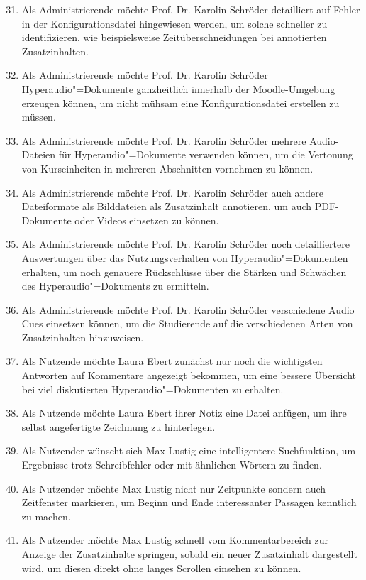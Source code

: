 \begin{enumerate}[leftmargin=1.3cm,label=US-\arabic*:,ref=US-\arabic*]
\setcounter{enumi}{30}
\item Als Administrierende möchte Prof. Dr. Karolin Schröder detailliert auf Fehler in der Konfigurationsdatei hingewiesen werden, um solche schneller zu identifizieren, wie beispielsweise Zeitüberschneidungen bei annotierten Zusatzinhalten.
\item Als Administrierende möchte Prof. Dr. Karolin Schröder Hyperaudio"=Dokumente ganzheitlich innerhalb der Moodle-Umgebung erzeugen können, um nicht mühsam eine Konfigurationsdatei erstellen zu müssen.
\item Als Administrierende möchte Prof. Dr. Karolin Schröder mehrere Audio-Dateien für Hyperaudio"=Dokumente verwenden können, um die Vertonung von Kurseinheiten in mehreren Abschnitten vornehmen zu können.
\item Als Administrierende möchte Prof. Dr. Karolin Schröder auch andere Dateiformate als Bilddateien als Zusatzinhalt annotieren, um auch PDF-Dokumente oder Videos einsetzen zu können.
\item Als Administrierende möchte Prof. Dr. Karolin Schröder noch detailliertere Auswertungen über das Nutzungsverhalten von Hyperaudio"=Dokumenten erhalten, um noch genauere Rückschlüsse über die Stärken und Schwächen des Hyperaudio"=Dokuments zu ermitteln. 
\item Als Administrierende möchte Prof. Dr. Karolin Schröder verschiedene Audio Cues einsetzen können, um die Studierende auf die verschiedenen Arten von Zusatzinhalten hinzuweisen.
\item \label{US-Kommentar-Bewertung} Als Nutzende möchte Laura Ebert zunächst nur noch die wichtigsten Antworten auf Kommentare angezeigt bekommen, um eine bessere Übersicht bei viel diskutierten Hyperaudio"=Dokumenten zu erhalten.
\item Als Nutzende möchte Laura Ebert ihrer Notiz eine Datei anfügen, um ihre selbst angefertigte Zeichnung zu hinterlegen.
\item Als Nutzender wünscht sich Max Lustig eine intelligentere Suchfunktion, um Ergebnisse trotz Schreibfehler oder mit ähnlichen Wörtern zu finden.
\item Als Nutzender möchte Max Lustig nicht nur Zeitpunkte sondern auch Zeitfenster markieren, um Beginn und Ende interessanter Passagen kenntlich zu machen.
\item Als Nutzender möchte Max Lustig schnell vom Kommentarbereich zur Anzeige der Zusatzinhalte springen, sobald ein neuer Zusatzinhalt dargestellt wird, um diesen direkt ohne langes Scrollen einsehen zu können.
\end{enumerate}

